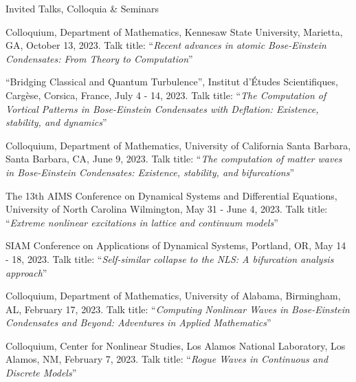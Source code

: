 \documentclass[10pt]{article} %
\begin{document}
\begin{section}{Invited Talks, Colloquia \& Seminars}
\begin{etaremune}
\item  Colloquium, Department of Mathematics, Kennesaw State University, Marietta, GA, October 13, 2023.
Talk title: ``\textit{Recent advances in atomic Bose-Einstein Condensates: From Theory to Computation}''

\item ``Bridging Classical and Quantum Turbulence'',
Institut d'\'Etudes Scientifiques, Cargèse, Corsica, France, July 4 - 14, 2023.
Talk title: ``\textit{The Computation of Vortical Patterns in Bose-Einstein Condensates with
Deflation: Existence, stability, and dynamics}''

\item Colloquium, Department of Mathematics, University of California Santa Barbara, Santa Barbara, CA, June 9, 2023.
Talk title: ``\textit{The computation of matter waves in Bose-Einstein Condensates: Existence, stability, and bifurcations}''


\item The 13th AIMS Conference on Dynamical Systems and Differential Equations, University of North Carolina Wilmington, %
May 31 - June 4, 2023. Talk title: ``\textit{Extreme nonlinear excitations in lattice and continuum models}''

\item SIAM Conference on Applications of Dynamical Systems, Portland, OR, May 14 - 18, 2023.
Talk title: ``\textit{Self-similar collapse to the NLS: A bifurcation analysis approach}''

\item Colloquium, Department of Mathematics, University of Alabama, Birmingham, AL, February 17, 2023.
Talk title: ``\textit{Computing Nonlinear Waves in Bose-Einstein Condensates and Beyond: Adventures in
Applied Mathematics}''

\item Colloquium, Center for Nonlinear Studies, Los Alamos National Laboratory, Los Alamos, NM, February 7, 2023.
      Talk title: ``\textit{Rogue Waves in Continuous and Discrete Models}''


\end{etaremune}
\end{section}
\end{document}
